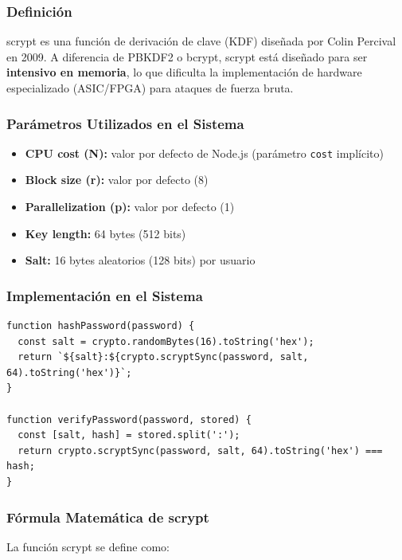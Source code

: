 \documentclass[12pt,a4paper,openany]{article}
\begin{document}
\subsubsection{Definición}

scrypt es una función de derivación de clave (KDF) diseñada por Colin Percival en 2009. A diferencia de PBKDF2 o bcrypt, scrypt está diseñado para ser \textbf{intensivo en memoria}, lo que dificulta la implementación de hardware especializado (ASIC/FPGA) para ataques de fuerza bruta.

\subsubsection{Parámetros Utilizados en el Sistema}

\begin{itemize}[leftmargin=*]
    \item \textbf{CPU cost (N):} valor por defecto de Node.js (parámetro \texttt{cost} implícito)
    \item \textbf{Block size (r):} valor por defecto (8)
    \item \textbf{Parallelization (p):} valor por defecto (1)
    \item \textbf{Key length:} 64 bytes (512 bits)
    \item \textbf{Salt:} 16 bytes aleatorios (128 bits) por usuario
\end{itemize}

\subsubsection{Implementación en el Sistema}

\begin{lstlisting}[style=jsstyle, caption={Función de hash de contraseñas}]
function hashPassword(password) {
  const salt = crypto.randomBytes(16).toString('hex');
  return `${salt}:${crypto.scryptSync(password, salt, 64).toString('hex')}`;
}

function verifyPassword(password, stored) {
  const [salt, hash] = stored.split(':');
  return crypto.scryptSync(password, salt, 64).toString('hex') === hash;
}
\end{lstlisting}

\subsubsection{Fórmula Matemática de scrypt}

La función scrypt se define como:
\end{document}
